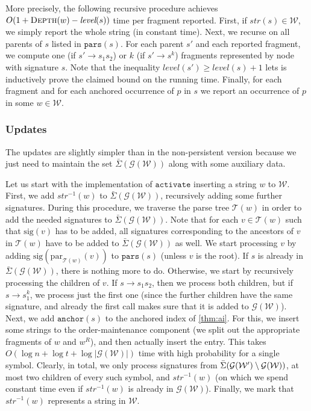 \documentclass[a4paper]{article}
\theoremstyle{remark}
\newcommand{\actop}{\mathtt{activate}}
\newcommand{\sigs}{\bar{\Sigma}}
\newcommand{\depth}{\textsc{Depth}}
\newcommand{\grammar}{\mathcal{G}}
\newcommand{\slev}{\textit{level}}
\newcommand{\stree}{\mathcal{T}}
\newcommand{\sstr}{\textit{str}}
\newcommand{\spar}[1]{\mathrm{par}_{\stree(#1)}}
\newcommand{\spars}{\mathtt{pars}}
\newcommand{\ussig}{\mathrm{sig}}
\newcommand{\coll}{\mathcal{W}}
\newcommand{\itanch}{\mathtt{anchor}}
\begin{document}
More precisely, the following recursive procedure achieves $O(1+\depth(w)-\slev(s))$ time per fragment reported.
First, if $\sstr(s)\in \coll$, we simply report the whole string (in constant time).
Next, we recurse on all parents of $s$ listed in $\spars(s)$.
For each parent $s'$ and each reported fragment, we compute one (if $s'\to s_1s_2$) or $k$ (if $s'\to s^k$) fragments
represented by node with signature $s$.
Note that the inequality $\slev(s')\ge \slev(s)+1$ lets is inductively prove the claimed bound on the running time.
Finally, for each fragment and for each anchored occurrence of $p$ in $s$ we report an occurrence of $p$ in some $w\in \coll$.

\subsubsection{Updates}
The updates are slightly simpler than in the non-persistent version because we just need to maintain
the set $\sigs(\grammar(\coll))$ along with some auxiliary data.

Let us start with the implementation of $\actop$ inserting a string $w$ to $\coll$. 
First, we add $\sstr^{-1}(w)$ to $\sigs(\grammar(\coll))$, recursively adding some further signatures.
During this procedure, we traverse the parse tree $\stree(w)$ in order to add the
needed signatures to $\sigs(\grammar(\coll))$.
Note that for each $v\in\stree(w)$ such that $\ussig(v)$ has to be added, all signatures
corresponding to the ancestors of $v$ in $\stree(w)$ have to be added to $\sigs(\grammar(\coll))$ as well.
We start processing $v$ by adding $\ussig(\spar{w}(v))$ to $\spars(s)$
(unless $v$ is the root). If $s$ is already in $\sigs(\grammar(\coll))$, there is nothing more to do.
Otherwise, we start by recursively processing the children of $v$.
If $s\to s_1s_2$, then we process both children, but if $s\to s_1^k$, we process just the first one (since the further children
have the same signature, and already the first call makes sure that it is added to $\grammar(\coll)$). 
Next, we add $\itanch(s)$ to the anchored index of \cref{thm:ai}. For this, we insert some strings to the order-maintenance
component (we split out the appropriate fragments of $w$ and $w^R$),
and then actually insert the entry. This takes $O(\log n+\log t + \log|\grammar(\coll)|)$ time with high probability for a single symbol.
Clearly, in total, we only process signatures from $\sigs(\grammar(\coll')\sm\grammar(\coll))$, at most two children of every such symbol,
and $\sstr^{-1}(w)$ (on which we spend constant time even if $\sstr^{-1}(w)$ is already in $\grammar(\coll)$).
Finally, we mark that $\sstr^{-1}(w)$ represents a string in $\coll$.
\end{document}
